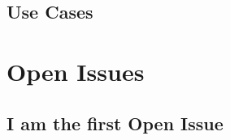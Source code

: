\documentclass[11pt,fleqn]{book} %
\begin{document}
	\section{Use Cases}
	
	


\chapter{Open Issues}

\section{I am the first Open Issue}
\end{document}

